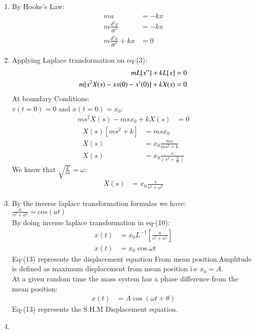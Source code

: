 \documentclass[journal,12pt,twocolumn]{IEEEtran}
\theoremstyle{remark}
\begin{document}
\begin{enumerate}
\\
\item{}
By Hooke's Law:
\begin{align}
    ma&=-kx\\
    m\frac{d^2x}{dt^2}&=-kx\\
    m\frac{d^2x}{dt^2}+kx&=0
\end{align}
\item{}
Applying Laplace transformation on eq-(3):
\begin{align}
    mL[x"]+kL[x]&=0\\
    m[s^2X(s)-sx(0)-x'(0)]+kX(s)&=0
\end{align}
At boundary Conditions:\\$v(t=0)=0$  and $x(t=0)=x_0$:
\begin{align}
  ms^2X(s)-msx_0+kX(s)&=0
  \end{align}
  \begin{align}
  X(s)[ms^2+k]&=msx_0\\
  X(s)&=x_0\frac{ms}{ms^2+k}\\
  X(s)&=x_0\frac{s}{(s^2+\frac{k}{m})}
\end{align}
We know that $\sqrt{\frac{k}{m}}=\omega$:
\begin{align}
X(s)&=x_0\frac{s}{s^2+\omega^2}
\end{align}
\item{}
By the inverse laplace transformation formulas we have:\\
$\frac{a}{s^2+a^2}=cos(at)$\\
By doing inverse laplace transformation in eq-(10):
\begin{align}
    x(t)&=x_0L^{-1}\left[\frac{a}{s^2+a^2}\right]\\
    x(t)&=x_0\cos{\omega{t}}
\end{align}
Eq-(13) represents the displacement equation From mean position.Amplitude is defined as maximum displacement from mean position i.e $x_0=A$.\\
At a given random time the mass system has a phase difference from the mean position:
\begin{align}
    x(t)&=A\cos(\omega{t}+\theta)
\end{align}
Eq-(13) represents the S.H.M Displacement equation.
\item{}

\end{enumerate}
\end{document}
